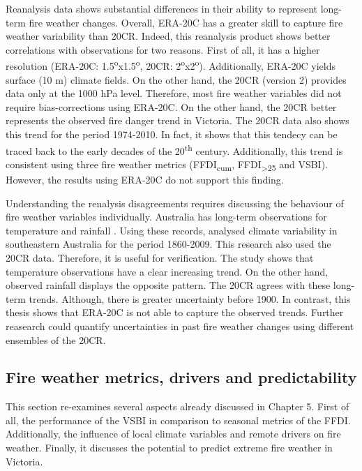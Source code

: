 Reanalysis data shows substantial differences in their ability to
represent long-term fire weather changes. Overall, ERA-20C has a greater
skill to capture fire weather variability than 20CR. Indeed, this
reanalysis product shows better correlations with observations for
two reasons. First of all, it has a higher resolution (ERA-20C: 1.5\textsuperscript{o}x1.5\textsuperscript{o},
20CR: 2\textsuperscript{o}x2\textsuperscript{o}). Additionally,
ERA-20C yields surface (10 m) climate fields. On the other hand, the
20CR (version 2) provides data only at the 1000 hPa level. Therefore,
most fire weather variables did not require bias-corrections using
ERA-20C. On the other hand, the 20CR better represents the observed
fire danger trend in Victoria. The 20CR data also shows this trend
for the period 1974-2010. In fact, it shows that this tendecy can
be traced back to the early decades of the 20\textsuperscript{th}
century. Additionally, this trend is consistent using three fire weather
metrics (FFDI\textsubscript{cum}, FFDI\textsubscript{>25} and VSBI).
However, the results using ERA-20C do not support this finding.

Understanding the renalysis disagreements requires discussing the
behaviour of fire weather variables individually. Australia has long-term
observations for temperature \citep{Trewin2013} and rainfall \citep{Laverly1997}.
Using these records, \citet{Ashcroft2014} analysed climate variability
in southeastern Australia for the period 1860-2009. This research
also used the 20CR data. Therefore, it is useful for verification.
The study shows that temperature observations have a clear increasing
trend. On the other hand, observed rainfall displays the opposite
pattern. The 20CR agrees with these long-term trends. Although, there
is greater uncertainty before 1900. In contrast, this thesis shows
that ERA-20C is not able to capture the observed trends. Further reasearch
could quantify uncertainties in past fire weather changes using different
ensembles of the 20CR. 


\subsection{Fire weather metrics, drivers and predictability}

This section re-examines several aspects already discussed in Chapter
5. First of all, the performance of the VSBI in comparison to seasonal
metrics of the FFDI. Additionally, the influence of local climate
variables and remote drivers on fire weather. Finally, it discusses
the potential to predict extreme fire weather in Victoria.

